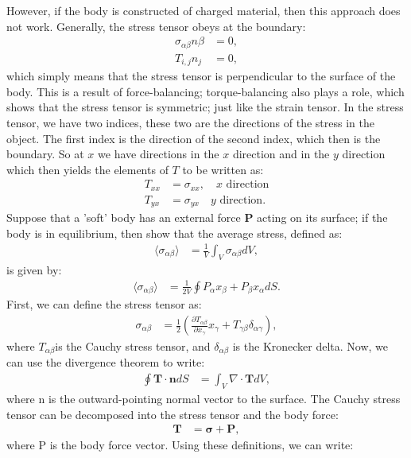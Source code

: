 \documentclass[a4paper]{article}
\begin{document}
However, if the body is constructed of charged material, then this approach does not work. Generally, the stress tensor obeys at the boundary:
\begin{align*}
    \sigma_{\alpha\beta}n\beta &= 0,\\
    T_{i,j}n_j &= 0,
\end{align*}which simply means that the stress tensor is perpendicular to the surface of the body. This is a result of force-balancing; torque-balancing also plays a role, which shows that the stress tensor is symmetric; just like the strain tensor.
In the stress tensor, we have two indices, these two are the directions of the stress in the object. The first index is the direction of the second index, which then is the boundary. So at $x$ we have directions in the $x$ direction and in the $y$ direction which then yields the elements of $T$ to be written as:
\begin{align*}
    T_{xx} &= \sigma_{xx},\quad \text{$x$ direction}\\
    T_{yx} &= \sigma_{yx}\quad \text{$y$ direction}.
\end{align*}Suppose that a 'soft' body has an external force $\mathbf{P}$ acting on its surface; if the body is in equilibrium, then show that the average stress, defined as:
\begin{align*}
    \langle\sigma_{\alpha\beta}\rangle &=\frac{1}{V}\int_V \sigma_{\alpha\beta}dV,
\end{align*}is given by:
\begin{align*}
    \langle\sigma_{\alpha\beta}\rangle &= \frac{1}{2V}\oint P_\alpha x_\beta + P_\beta x_\alpha dS.
\end{align*}First, we can define the stress tensor as:
\begin{align*}
  \sigma_{\alpha\beta} &= \frac{1}{2}\left(\frac{\partial T_{\alpha\beta}}{\partial x_\gamma} x_\gamma + T_{\gamma\beta}\delta_{\alpha\gamma}\right),
\end{align*}where $T_{\alpha\beta}$is the Cauchy stress tensor, and $\delta_{\alpha\beta}$ is the Kronecker delta. Now, we can use the divergence theorem to write:
\begin{align*}
  \oint \mathbf{T} \cdot \mathbf{n} dS &= \int_V \nabla \cdot \mathbf{T} dV,
\end{align*}where n is the outward-pointing normal vector to the surface. The Cauchy stress tensor can be decomposed into the stress tensor and the body force:
\begin{align*}
  \mathbf{T} &= \mathbf{\sigma} + \mathbf{P},
\end{align*}where P is the body force vector. Using these definitions, we can write:
\end{document}
